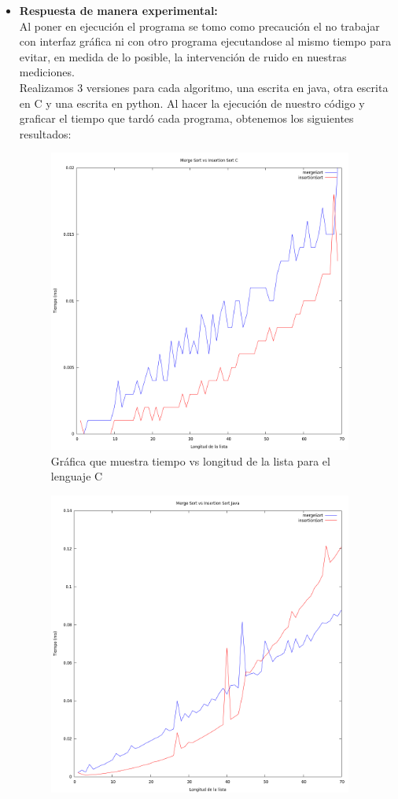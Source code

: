 \documentclass[11 pt, a4paper]{article}
\theoremstyle{definition}
\begin{document}
\begin{enumerate}
\begin{itemize}
  \item \textbf{Respuesta de manera experimental:} \\ 
Al poner en ejecución el programa se tomo como precaución el
	no trabajar con interfaz gráfica ni con otro programa ejecutandose
	al mismo tiempo para evitar, en medida de lo posible, 
	la intervención de ruido en nuestras mediciones.\\ 
	Realizamos 3 versiones para cada algoritmo, una escrita
	en java, otra escrita en C y una escrita en python. Al 
	hacer la ejecución de nuestro código y graficar el tiempo
	que tardó cada programa, obtenemos los siguientes resultados:
\begin{figure}[H]
         \centering
          \includegraphics[trim=0cm 0cm 0cm 0cm, width=10cm]{C.png} 
          \caption{Gráfica que muestra tiempo vs longitud de la lista para el lenguaje C}
      \end{figure}
\begin{figure}[H]
         \centering
          \includegraphics[trim=0cm 0cm 0cm 0cm, width=10cm]{Java.png} 

\end{figure}
\end{itemize}
\end{enumerate}
\end{document}
